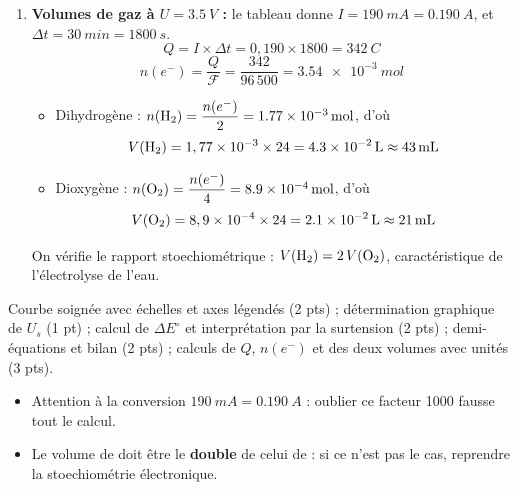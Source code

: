 \documentclass[11pt]{article}
\begin{document}
\begin{corrige}
\begin{enumerate}
\item \textbf{Volumes de gaz à $U = \SI{3,5}{V}$ :} le tableau donne $I = \SI{190}{mA} = \SI{0,190}{A}$, et $\Delta t = \SI{30}{min} = \SI{1800}{s}$.
\[ Q = I \times \Delta t = 0,190 \times 1800 = \SI{342}{C} \]
\[ n(e^-) = \frac{Q}{\mathcal{F}} = \frac{342}{96\,500} = \SI{3,54e-3}{mol} \]
\begin{itemize}
\item Dihydrogène : $n(\ce{H2}) = \dfrac{n(e^-)}{2} = \SI{1,77e-3}{mol}$, d'où
\[ V(\ce{H2}) = 1,77 \times 10^{-3} \times 24 = \SI{4,3e-2}{L} \approx \SI{43}{mL} \]
\item Dioxygène : $n(\ce{O2}) = \dfrac{n(e^-)}{4} = \SI{8,9e-4}{mol}$, d'où
\[ V(\ce{O2}) = 8,9 \times 10^{-4} \times 24 = \SI{2,1e-2}{L} \approx \SI{21}{mL} \]
\end{itemize}
On vérifie le rapport stoechiométrique : $V(\ce{H2}) = 2\,V(\ce{O2})$, caractéristique de l'électrolyse de l'eau.
\end{enumerate}
\end{corrige}

\begin{attention}
Courbe soignée avec échelles et axes légendés (2 pts) ; détermination graphique de $U_s$ (1 pt) ; calcul de $\Delta E^\circ$ et interprétation par la surtension (2 pts) ; demi-équations et bilan (2 pts) ; calculs de $Q$, $n(e^-)$ et des deux volumes avec unités (3 pts).
\begin{itemize}
\item Attention à la conversion $\SI{190}{mA} = \SI{0,190}{A}$ : oublier ce facteur 1000 fausse tout le calcul.
\item Le volume de  doit être le \textbf{double} de celui de  : si ce n'est pas le cas, reprendre la stoechiométrie électronique.
\end{itemize}
\end{attention}
\end{document}

